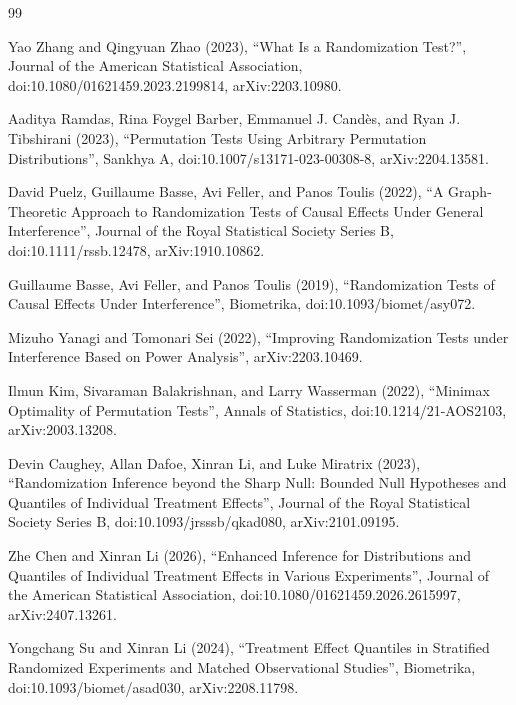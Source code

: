 \documentclass{article}
\begin{document}
\begin{thebibliography}{99}

   Yao Zhang and Qingyuan Zhao (2023), ``What Is a Randomization Test?'', Journal of the American Statistical Association, doi:10.1080/01621459.2023.2199814, arXiv:2203.10980.

   Aaditya Ramdas, Rina Foygel Barber, Emmanuel J. Candès, and Ryan J. Tibshirani (2023), ``Permutation Tests Using Arbitrary Permutation Distributions'', Sankhya A, doi:10.1007/s13171-023-00308-8, arXiv:2204.13581.

   David Puelz, Guillaume Basse, Avi Feller, and Panos Toulis (2022), ``A Graph-Theoretic Approach to Randomization Tests of Causal Effects Under General Interference'', Journal of the Royal Statistical Society Series B, doi:10.1111/rssb.12478, arXiv:1910.10862.

   Guillaume Basse, Avi Feller, and Panos Toulis (2019), ``Randomization Tests of Causal Effects Under Interference'', Biometrika, doi:10.1093/biomet/asy072.

   Mizuho Yanagi and Tomonari Sei (2022), ``Improving Randomization Tests under Interference Based on Power Analysis'', arXiv:2203.10469.

   Ilmun Kim, Sivaraman Balakrishnan, and Larry Wasserman (2022), ``Minimax Optimality of Permutation Tests'', Annals of Statistics, doi:10.1214/21-AOS2103, arXiv:2003.13208.

   Devin Caughey, Allan Dafoe, Xinran Li, and Luke Miratrix (2023), ``Randomization Inference beyond the Sharp Null: Bounded Null Hypotheses and Quantiles of Individual Treatment Effects'', Journal of the Royal Statistical Society Series B, doi:10.1093/jrsssb/qkad080, arXiv:2101.09195.

   Zhe Chen and Xinran Li (2026), ``Enhanced Inference for Distributions and Quantiles of Individual Treatment Effects in Various Experiments'', Journal of the American Statistical Association, doi:10.1080/01621459.2026.2615997, arXiv:2407.13261.

   Yongchang Su and Xinran Li (2024), ``Treatment Effect Quantiles in Stratified Randomized Experiments and Matched Observational Studies'', Biometrika, doi:10.1093/biomet/asad030, arXiv:2208.11798.


\end{thebibliography}
\end{document}
